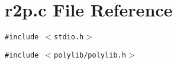 \section{r2p.c File Reference}
\label{r2p_8c}
{\tt \#include $<$stdio.h$>$}\par
{\tt \#include $<$polylib/polylib.h$>$}\par
